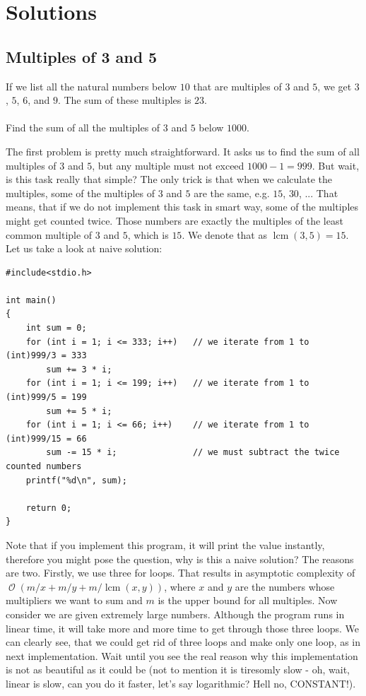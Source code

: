 \documentclass{book}
\DeclareMathOperator{\lcm}{lcm}
\DeclareMathOperator{\bigo}{\mathcal{O}}
\newenvironment{task}
  {\begin{mdframed}[backgroundcolor=lightgray]}
  {\end{mdframed}}
\begin{document}
\chapter{Solutions}

\section{Multiples of 3 and 5}

\begin{task}
If we list all the natural numbers below $10$ that are multiples of $3$ and $5$, we get $3$, $5$, $6$, and $9$. The sum of these multiples is $23$.\\
\\
Find the sum of all the multiples of $3$ and $5$ below $1000$.
\end{task}

The first problem is pretty much straightforward. It asks us to find the sum of all multiples of $3$
and $5$, but any multiple must not exceed $1000 - 1 = 999$. But wait, is this task really that simple?
The only trick is that when we calculate the multiples, some of the multiples of $3$ and $5$ are the
same, e.g. $15$, $30$, ... That means, that if we do not implement this task in smart way, some of the
multiples might get counted twice. Those numbers are exactly the multiples of the least common
multiple of $3$ and $5$, which is $15$. We denote that as $\lcm(3, 5) = 15$.\\

Let us take a look at naive solution:

\begin{verbatim}
#include<stdio.h>

int main()
{
    int sum = 0;
    for (int i = 1; i <= 333; i++)   // we iterate from 1 to (int)999/3 = 333
        sum += 3 * i;
    for (int i = 1; i <= 199; i++)   // we iterate from 1 to (int)999/5 = 199
        sum += 5 * i;
    for (int i = 1; i <= 66; i++)    // we iterate from 1 to (int)999/15 = 66
        sum -= 15 * i;               // we must subtract the twice counted numbers
    printf("%d\n", sum);

    return 0;
}
\end{verbatim}

Note that if you implement this program, it will print the value instantly, therefore you might pose the question, why is this a naive solution?
The reasons are two. Firstly, we use three for loops. That results in asymptotic complexity of $\bigo(m/x + m/y + m/ \lcm(x, y))$, where $x$ and $y$ are the numbers whose multipliers we want to sum and $m$ is the upper bound for all multiples. Now consider we are given extremely large numbers. Although the program runs in linear time, it will take more and more time to get through those three loops. We can clearly see, that we could get rid of three loops and make only one loop, as in next implementation. Wait until you see the real reason why this implementation is not as beautiful as it could be (not to mention it is tiresomly slow - oh, wait, linear is slow, can you do it faster, let’s say logarithmic? Hell no, CONSTANT!).
\end{document}
